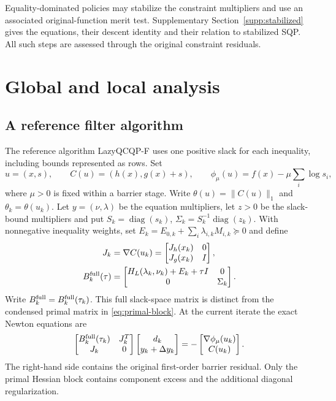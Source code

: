 \documentclass[pdflatex,sn-mathphys-num]{sn-jnl}
\theoremstyle{thmstyleone}
\theoremstyle{thmstylethree}
\newcounter{algorithm}
\begin{document}
Equality-dominated policies may stabilize the constraint multipliers and use
an associated original-function merit test. Supplementary
Section~\ref{supp:stabilized} gives the equations, their descent identity
and their relation to stabilized SQP. All such steps are assessed through
the original constraint residuals.

\section{Global and local analysis}\label{sec:theory}
\subsection{A reference filter algorithm}
\label{sec:filtered-main}
The reference algorithm LazyQCQP-F uses one positive slack for each
inequality, including bounds represented as rows. Set
\[
 u=(x,s),\qquad C(u)=(h(x),g(x)+s),\qquad
 \phi_\mu(u)=f(x)-\mu\sum_i\log s_i,
\]
where $\mu>0$ is fixed within a barrier stage. Write
$\theta(u)=\|C(u)\|_1$ and $\theta_k=\theta(u_k)$. Let
$y=(\nu,\lambda)$ be the equation multipliers, let $z>0$ be the
slack-bound multipliers and put $S_k=\operatorname{diag}(s_k)$,
$\Sigma_k=S_k^{-1}\operatorname{diag}(z_k)$. With nonnegative inequality weights, set
$E_k=E_{0,k}+\sum_i\lambda_{i,k}M_{i,k}\succeq0$ and define
\[
 \begin{split}
 J_k&=\nabla C(u_k)=
   \begin{bmatrix}J_h(x_k)&0\\J_g(x_k)&I\end{bmatrix},\\
 B_k^{\rm full}(\tau)&=
   \begin{bmatrix}
    H_L(\lambda_k,\nu_k)+E_k+\tau I&0\\0&\Sigma_k
   \end{bmatrix}.
 \end{split}
\]
Write $B_k^{\rm full}=B_k^{\rm full}(\tau_k)$.
This full slack-space matrix is distinct from the condensed primal
matrix in \eqref{eq:primal-block}. At the current iterate the exact Newton
equations are
\[
 \begin{bmatrix}B_k^{\rm full}(\tau_k)&J_k^T\\J_k&0\end{bmatrix}
 \begin{bmatrix}d_k\\y_k+\Delta y_k\end{bmatrix}
 =-\begin{bmatrix}\nabla\phi_\mu(u_k)\\C(u_k)\end{bmatrix}.
\]
The right-hand side contains the original first-order barrier residual.
Only the primal Hessian block contains component excess and the
additional diagonal regularization.
\end{document}
